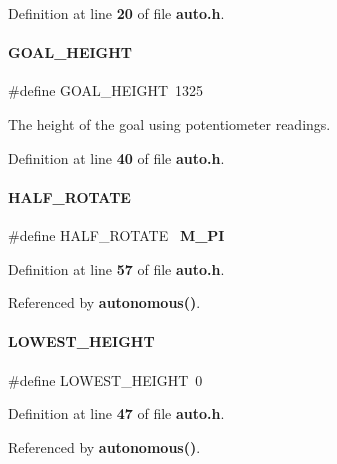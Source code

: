 Definition at line \textbf{ 20} of file \textbf{ auto.\+h}.

\mbox{\label{auto_8h_a83cf08759ac4ffc3ea6e3b7f9c406b3c}} 
\paragraph{G\+O\+A\+L\+\_\+\+H\+E\+I\+G\+HT}
{\footnotesize\ttfamily \#define G\+O\+A\+L\+\_\+\+H\+E\+I\+G\+HT~1325}



The height of the goal using potentiometer readings. 



Definition at line \textbf{ 40} of file \textbf{ auto.\+h}.

\mbox{\label{auto_8h_a57b89da6e342bd7556800463135d03ee}} 
\paragraph{H\+A\+L\+F\+\_\+\+R\+O\+T\+A\+TE}
{\footnotesize\ttfamily \#define H\+A\+L\+F\+\_\+\+R\+O\+T\+A\+TE~\textbf{ M\+\_\+\+PI}}



Definition at line \textbf{ 57} of file \textbf{ auto.\+h}.



Referenced by \textbf{ autonomous()}.

\mbox{\label{auto_8h_af364d4d51593fe601f20090221f9ddab}} 
\paragraph{L\+O\+W\+E\+S\+T\+\_\+\+H\+E\+I\+G\+HT}
{\footnotesize\ttfamily \#define L\+O\+W\+E\+S\+T\+\_\+\+H\+E\+I\+G\+HT~0}



Definition at line \textbf{ 47} of file \textbf{ auto.\+h}.



Referenced by \textbf{ autonomous()}.

